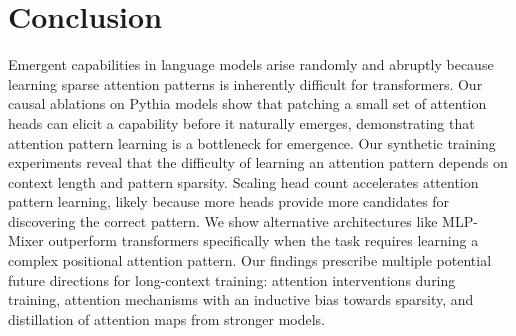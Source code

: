 \documentclass{article}
\begin{document}

\section{Conclusion}

Emergent capabilities in language models arise randomly and abruptly because learning sparse attention patterns is inherently difficult for transformers. Our causal ablations on Pythia models show that patching a small set of attention heads can elicit a capability before it naturally emerges, demonstrating that attention pattern learning is a bottleneck for emergence. Our synthetic training experiments reveal that the difficulty of learning an attention pattern depends on context length and pattern sparsity. Scaling head count accelerates attention pattern learning, likely because more heads provide more candidates for discovering the correct pattern. We show alternative architectures like MLP-Mixer outperform transformers specifically when the task requires learning a complex positional attention pattern. Our findings prescribe multiple potential future directions for long-context training: attention interventions during training, attention mechanisms with an inductive bias towards sparsity, and distillation of attention maps from stronger models.
\end{document}
